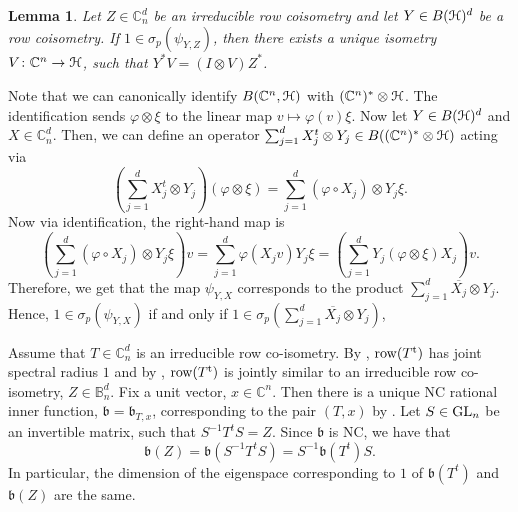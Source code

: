\documentclass{article}
\newtheorem{lem}[thm]{Lemma}
\theoremstyle{definition}
\theoremstyle{remark}
\numberwithin{equation}{section}
\newcommand{\mr}{\ensuremath{\mathrm}}
\def\C{\mathbb{C}}
\def\B{\mathbb{B}}
\def\fb{\mathfrak{b}}
\def\mrt{\mathrm{t}}
\begin{document}
\begin{lem} \label{lem:spectrum_to_isometry}
Let $Z \in \C^d_n$ be an irreducible row coisometry and let $Y \in B({\mathcal H})^d$ be a row coisometry. If $1 \in \sigma_p(\psi_{Y,Z})$, then there exists a unique isometry $V \colon \C^n \to \cH$, such that $Y^* V = (I \otimes V) Z^*$.
\end{lem}




Note that we can canonically identify $B(\C^n, \cH)$ with $(\C^n)^* \otimes \cH$. The identification sends $\varphi \otimes \xi$ to the linear map $v \mapsto \varphi(v) \xi$. Now let $Y \in B({\mathcal H})^d$ and $X \in \C^d_n$. Then, we can define an operator $\sum_{j=1}^d X_j^t \otimes Y_j \in B((\C^n)^* \otimes \cH)$ acting via
\[
\left(\sum_{j=1}^d X_j^t \otimes Y_j \right) (\varphi \otimes \xi) = \sum_{j=1}^d (\varphi \circ X_j) \otimes Y_j \xi.
\]
Now via identification, the right-hand map is
\[
\left(\sum_{j=1}^d (\varphi \circ X_j) \otimes Y_j \xi\right) v = \sum_{j=1}^d \varphi(X_j v) Y_j \xi = 
\left(\sum_{j=1}^d Y_j (\varphi \otimes \xi) X_j\right) v.
\]
Therefore, we get that the map $\psi_{Y,X}$ corresponds to the product $\sum_{j=1}^d \overline{X_j} \otimes Y_j$. Hence, $1 \in \sigma_p(\psi_{Y,X})$ if and only if $1 \in \sigma_p \left( \sum_{j=1}^d \overline{X_j} \otimes Y_j \right)$,


Assume that $T \in \C ^d _n$ is an irreducible row co-isometry. By \cite[Lemma 2.1]{JMS-ncratClark}, $\mr{row} (T ^\mrt )$ has joint spectral radius $1$ and by \cite[Lemma 4.10]{SSS-bounded}, $\mr{row} (T ^\mrt )$ is jointly similar to an irreducible row co-isometry, $Z \in \B ^d _n$. Fix a unit vector, $x \in \C ^n$. Then there is a unique NC rational inner function, $\fb = \fb _{T, x}$, corresponding to the pair $(T,x)$ by \cite[Theorem 4.1]{JMS-ncratClark}. Let $S \in \mathrm{GL}_n$ be an invertible matrix, such that $S^{-1} T^t S = Z$. Since $\fb$ is NC, we have that $$\fb(Z) = \fb(S^{-1} T^t S) = S^{-1} \fb(T^t) S.$$
In particular, the dimension of the eigenspace corresponding to $1$ of $\fb(T^t)$ and $\fb(Z)$ are the same. 
\end{document}
